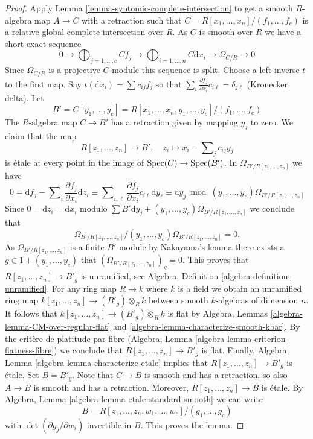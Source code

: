 \begin{proof}
Apply Lemma \ref{lemma-syntomic-complete-intersection}
to get a smooth $R$-algebra map $A \to C$ with a retraction such that
$C = R[x_1, \ldots, x_n]/(f_1, \ldots, f_c)$
is a relative global complete intersection over $R$. As $C$ is smooth
over $R$ we have a short exact sequence
$$
0 \to
\bigoplus\nolimits_{j = 1, \ldots, c} C f_j \to
\bigoplus\nolimits_{i = 1, \ldots, n} C\text{d}x_i \to
\Omega_{C/R} \to 0
$$
Since $\Omega_{C/R}$ is a projective $C$-module this sequence is split.
Choose a left inverse $t$ to the first map. Say
$t(\text{d}x_i) = \sum c_{ij} f_j$
so that $\sum_i \frac{\partial f_j}{\partial x_i} c_{i\ell} = \delta_{j\ell}$
(Kronecker delta). Let
$$
B' = C[y_1, \ldots, y_c] =
R[x_1, \ldots, x_n, y_1, \ldots, y_c]/(f_1, \ldots, f_c)
$$
The $R$-algebra map $C \to B'$ has a retraction given by mapping $y_j$ to zero.
We claim that the map
$$
R[z_1, \ldots, z_n] \longrightarrow B',\quad
z_i \longmapsto x_i - \sum\nolimits_j c_{ij} y_j
$$
is \'etale at every point in the image of $\mathop{\rm Spec}(C) \to \mathop{\rm Spec}(B')$.
In $\Omega_{B'/R[z_1, \ldots, z_n]}$ we have
$$
0 =
\text{d}f_j - \sum\nolimits_i \frac{\partial f_j}{\partial x_i} \text{d}z_i
\equiv
\sum\nolimits_{i, \ell}
\frac{\partial f_j}{\partial x_i} c_{i\ell} \text{d}y_\ell
\equiv
\text{d}y_j \bmod (y_1, \ldots, y_c)\Omega_{B'/R[z_1, \ldots, z_n]}
$$
Since $0 = \text{d}z_i = \text{d}x_i$ modulo
$\sum B'\text{d}y_j + (y_1, \ldots, y_c)\Omega_{B'/R[z_1, \ldots, z_n]}$
we conclude that
$$
\Omega_{B'/R[z_1, \ldots, z_n]}/
(y_1, \ldots, y_c)\Omega_{B'/R[z_1, \ldots, z_n]} = 0.
$$
As $\Omega_{B'/R[z_1, \ldots, z_n]}$ is a finite $B'$-module
by Nakayama's lemma there exists a $g \in 1 + (y_1, \ldots, y_c)$
that $(\Omega_{B'/R[z_1, \ldots, z_n]})_g = 0$. This proves that
$R[z_1, \ldots, z_n] \to B'_g$ is unramified, see
Algebra, Definition \ref{algebra-definition-unramified}.
For any ring map $R \to k$ where $k$ is a field we obtain an
unramified ring map $k[z_1, \ldots, z_n] \to (B'_g) \otimes_R k$
between smooth $k$-algebras of dimension $n$. It follows that
$k[z_1, \ldots, z_n] \to (B'_g) \otimes_R k$ is flat by
Algebra, Lemmas \ref{algebra-lemma-CM-over-regular-flat} and
\ref{algebra-lemma-characterize-smooth-kbar}. By the crit\`ere
de platitude par fibre
(Algebra, Lemma \ref{algebra-lemma-criterion-flatness-fibre})
we conclude that $R[z_1, \ldots, z_n] \to B'_g$ is flat.
Finally, Algebra, Lemma \ref{algebra-lemma-characterize-etale}
implies that $R[z_1, \ldots, z_n] \to B'_g$ is \'etale.
Set $B = B'_g$. Note that $C \to B$ is smooth and has a retraction,
so also $A \to B$ is smooth and has a retraction.
Moreover, $R[z_1, \ldots, z_n] \to B$ is \'etale.
By Algebra, Lemma \ref{algebra-lemma-etale-standard-smooth}
we can write
$$
B = R[z_1, \ldots, z_n, w_1, \ldots, w_c]/(g_1, \ldots, g_c)
$$
with $\det(\partial g_j/\partial w_i)$ invertible in $B$.
This proves the lemma.
\end{proof}

